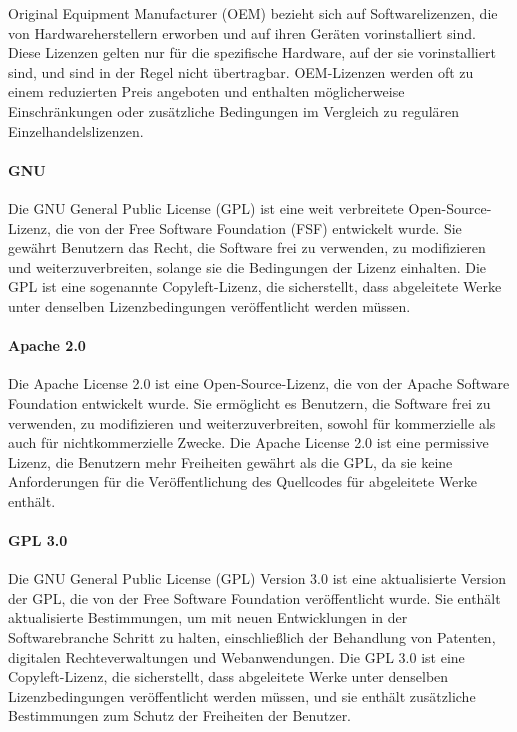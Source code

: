 Original Equipment Manufacturer (OEM) bezieht sich auf Softwarelizenzen, die von Hardwareherstellern erworben und auf ihren Geräten vorinstalliert sind. Diese Lizenzen gelten nur für die spezifische Hardware, auf der sie vorinstalliert sind, und sind in der Regel nicht übertragbar. OEM-Lizenzen werden oft zu einem reduzierten Preis angeboten und enthalten möglicherweise Einschränkungen oder zusätzliche Bedingungen im Vergleich zu regulären Einzelhandelslizenzen.

\paragraph{GNU}

Die GNU General Public License (GPL) ist eine weit verbreitete Open-Source-Lizenz, die von der Free Software Foundation (FSF) entwickelt wurde. Sie gewährt Benutzern das Recht, die Software frei zu verwenden, zu modifizieren und weiterzuverbreiten, solange sie die Bedingungen der Lizenz einhalten. Die GPL ist eine sogenannte Copyleft-Lizenz, die sicherstellt, dass abgeleitete Werke unter denselben Lizenzbedingungen veröffentlicht werden müssen.

\paragraph{Apache 2.0}

Die Apache License 2.0 ist eine Open-Source-Lizenz, die von der Apache Software Foundation entwickelt wurde. Sie ermöglicht es Benutzern, die Software frei zu verwenden, zu modifizieren und weiterzuverbreiten, sowohl für kommerzielle als auch für nichtkommerzielle Zwecke. Die Apache License 2.0 ist eine permissive Lizenz, die Benutzern mehr Freiheiten gewährt als die GPL, da sie keine Anforderungen für die Veröffentlichung des Quellcodes für abgeleitete Werke enthält.

\paragraph{GPL 3.0}

Die GNU General Public License (GPL) Version 3.0 ist eine aktualisierte Version der GPL, die von der Free Software Foundation veröffentlicht wurde. Sie enthält aktualisierte Bestimmungen, um mit neuen Entwicklungen in der Softwarebranche Schritt zu halten, einschließlich der Behandlung von Patenten, digitalen Rechteverwaltungen und Webanwendungen. Die GPL 3.0 ist eine Copyleft-Lizenz, die sicherstellt, dass abgeleitete Werke unter denselben Lizenzbedingungen veröffentlicht werden müssen, und sie enthält zusätzliche Bestimmungen zum Schutz der Freiheiten der Benutzer.